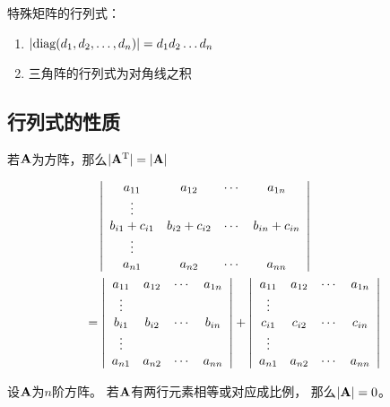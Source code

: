 特殊矩阵的行列式：
\begin{enumerate}
  \item $|\mdiag(d_1,d_2,\dots,d_n)| = d_1d_2\dots d_n$
  \item 三角阵的行列式为对角线之积
\end{enumerate}

\subsection{行列式的性质}
\begin{theorem}
  若$\mmA$为方阵，那么$|\mmA^\mT| = |\mmA|$
\end{theorem}

\begin{theorem}
  \begin{align*}
    &\quad\mdet{cccc}{
      a_{11} & a_{12} & \cdots & a_{1n} \\
      \vdots &        &        &        \\
      b_{i1} + c_{i1} & b_{i2} + c_{i2}  & \cdots & b_{in} + c_{in} \\
      \vdots &        &        &        \\
      a_{n1} & a_{n2} & \cdots & a_{nn} } \\
    &= \mdet{cccc}{
      a_{11} & a_{12} & \cdots & a_{1n} \\
      \vdots &        &        &        \\
      b_{i1} & b_{i2} & \cdots & b_{in} \\
      \vdots &        &        &        \\
      a_{n1} & a_{n2} & \cdots & a_{nn} }
    + \mdet{cccc}{
      a_{11} & a_{12} & \cdots & a_{1n} \\
      \vdots &        &        &        \\
      c_{i1} & c_{i2} & \cdots & c_{in} \\
      \vdots &        &        &        \\
      a_{n1} & a_{n2} & \cdots & a_{nn} }
    \end{align*}
\end{theorem}

\begin{theorem}
  设$\mmA$为$n$阶方阵。
  若$\mmA$有两行元素相等或对应成比例，
  那么$|\mmA| = 0$。
\end{theorem}

